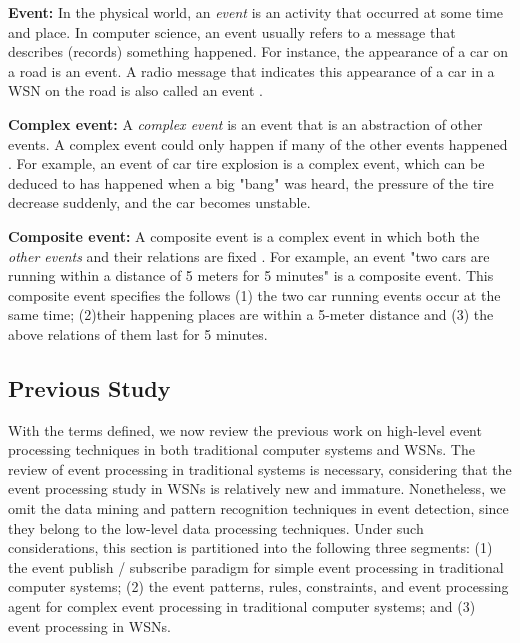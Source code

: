 \documentclass[12pt,journal,draftcls,letterpaper,onecolumn]{elsarticle}
\begin{document}
\textbf{Event:} In the physical world, an \emph{event} is an
activity that occurred at some time and place. In computer science,
an event usually refers to a message that describes (records)
something happened. For instance, the appearance of a car on a road
is an event. A radio message that indicates this appearance of a car
in a WSN on the road is also called an event \cite{1483263}.

\textbf{Complex event:} A \emph{complex event} is an event that is
an abstraction of other events.  A complex event could only happen
if many of the other events happened \cite{1483263}. For example, an
event of car tire explosion is a complex event, which can be deduced
to has happened when a big "bang" was heard, the pressure of the
tire decrease suddenly, and the car becomes unstable.

\textbf{Composite event:} A composite event is a complex event in
which both the \emph{other events} and their relations are fixed
\cite{1483263}. For example, an event "two cars are running within a
distance of 5 meters for 5 minutes" is a composite event. This
composite event specifies the follows (1) the two car running events
occur at the same time; (2)their happening places are within a
5-meter distance and (3) the above relations of them last for 5
minutes.

\subsection{Previous Study}
\label{subsec:Previous Study}

With the terms defined, we now review the previous work on
high-level event processing techniques in both traditional computer
systems and WSNs. The review of event processing in traditional
systems is necessary, considering that the event processing study in
WSNs is relatively new and immature. Nonetheless, we omit the data
mining and pattern recognition techniques in event detection, since
they belong to the low-level data processing techniques. Under such
considerations, this section is partitioned into the following three
segments: (1) the event publish / subscribe paradigm for simple
event processing in traditional computer systems; (2) the event
patterns, rules, constraints, and event processing agent for complex
event processing in traditional computer systems; and (3) event
processing in WSNs.
\end{document}
